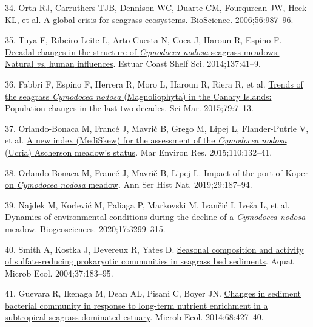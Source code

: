 \documentclass[
  12 pt,
]{article}
\newlength{\cslhangindent}
\newlength{\cslentryspacingunit} %
\newenvironment{CSLReferences}[2] %
 {%
  \setlength{\parindent}{0pt}
  \ifodd #1
  \let\oldpar\par
  \def\par{\hangindent=\cslhangindent\oldpar}
  \fi
  \setlength{\parskip}{#2\cslentryspacingunit}
 }%
 {}
\begin{document}
\begin{CSLReferences}{0}{0}
\leavevmode{}%
34. Orth RJ, Carruthers TJB, Dennison WC, Duarte CM, Fourqurean JW, Heck KL, et al. \href{https://doi.org/10.1641/0006-3568(2006)56\%5B987:AGCFSE\%5D2.0.CO;2}{A global crisis for seagrass ecosystems}. BioScience. 2006;56:987--96.

\leavevmode{}%
35. Tuya F, Ribeiro-Leite L, Arto-Cuesta N, Coca J, Haroun R, Espino F. \href{https://doi.org/10.1016/j.ecss.2013.11.026}{Decadal changes in the structure of {{\emph{Cymodocea nodosa}}} seagrass meadows: {Natural} {{\emph{vs.}}} {human} influences}. Estuar Coast Shelf Sci. 2014;137:41--9.

\leavevmode{}%
36. Fabbri F, Espino F, Herrera R, Moro L, Haroun R, Riera R, et al. \href{https://doi.org/10.3989/scimar.04165.19B}{Trends of the seagrass {{\emph{Cymodocea nodosa}}} ({Magnoliophyta}) in the {Canary Islands}: Population changes in the last two decades}. Sci Mar. 2015;79:7--13.

\leavevmode{}%
37. Orlando-Bonaca M, Francé J, Mavrič B, Grego M, Lipej L, Flander-Putrle V, et al. \href{https://doi.org/10.1016/j.marenvres.2015.08.009}{A new index ({MediSkew}) for the assessment of the {{\emph{Cymodocea nodosa}}} ({Ucria}) {Ascherson} meadow's status}. Mar Environ Res. 2015;110:132--41.

\leavevmode{}%
38. Orlando-Bonaca M, Francé J, Mavrič B, Lipej L. \href{https://doi.org/10.19233/ASHN.2019.18}{Impact of the port of {Koper} on {{\emph{Cymodocea nodosa}}} meadow}. Ann Ser Hist Nat. 2019;29:187--94.

\leavevmode{}%
39. Najdek M, Korlević M, Paliaga P, Markovski M, Ivančić I, Iveša L, et al. \href{https://doi.org/10.5194/bg-17-3299-2020}{Dynamics of environmental conditions during the decline of a {{\emph{Cymodocea nodosa}}} meadow}. Biogeosciences. 2020;17:3299--315.

\leavevmode{}%
40. Smith A, Kostka J, Devereux R, Yates D. \href{https://doi.org/10.3354/ame037183}{Seasonal composition and activity of sulfate-reducing prokaryotic communities in seagrass bed sediments}. Aquat Microb Ecol. 2004;37:183--95.

\leavevmode{}%
41. Guevara R, Ikenaga M, Dean AL, Pisani C, Boyer JN. \href{https://doi.org/10.1007/s00248-014-0418-1}{Changes in sediment bacterial community in response to long-term nutrient enrichment in a subtropical seagrass-dominated estuary}. Microb Ecol. 2014;68:427--40.


\end{CSLReferences}
\end{document}
